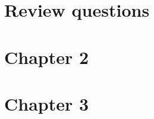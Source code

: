 \documentclass[12pt]{article}
\begin{document}
\maketitle


\begin{enumerate}
\section*{Review questions}



\section*{Chapter 2}



\section*{Chapter 3}



\end{enumerate}
\end{document}
